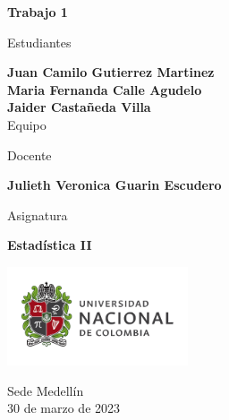 \begin{titlepage}
   \Large{
   \begin{center}
       \vspace*{1cm}

       \textbf{Trabajo 1}

            
       \vspace{1.5cm}
       
       Estudiantes
       
       \vspace{0.5cm}
        
	\textbf{Juan Camilo Gutierrez Martinez}\\    

  \textbf{Maria Fernanda Calle Agudelo}\\

	\textbf{Jaider Castañeda Villa}\\


              \vspace{1cm}
      Equipo 
       
       Docente
       
       \vspace{0.5cm}

       \textbf{Julieth Veronica Guarin Escudero}
       
       \vspace{0.4cm}

       \vspace{1.4cm}
       
       Asignatura
       
       \vspace{0.5cm}

       \textbf{Estadística II}

       \vfill

            
       \vspace{0.4cm}
     
       \includegraphics[width=0.4\textwidth]{logounal.png}
            
       Sede Medellín\\
       30 de marzo de 2023
       
   \end{center}
   }
\end{titlepage}